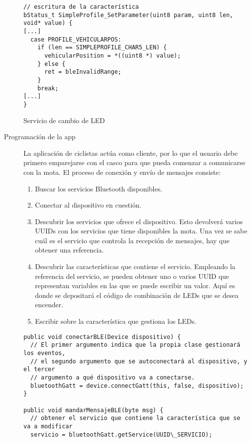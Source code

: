 \begin{description}
\begin{listing}
\begin{minipage}{.4\textwidth}
\begin{verbatim}
// escritura de la característica
bStatus_t SimpleProfile_SetParameter(uint8 param, uint8 len, void* value) {
[...]	
  case PROFILE_VEHICULARPOS:
    if (len == SIMPLEPROFILE_CHAR5_LEN) {
      vehicularPosition = *((uint8 *) value);	
    } else {
      ret = bleInvalidRange;
    }
    break;
[...]
}
			\end{verbatim}
		\end{minipage}
		\caption{Servicio de cambio de LED}\label{alg:mota}
	\end{listing}
	\item[Programación de la app] La aplicación de ciclistas actúa como cliente, por lo que el usuario debe primero emparejarse con el casco para que pueda comenzar a comunicarse con la mota. El proceso de conexión y envío de mensajes consiste:
		\begin{enumerate}
			\item Buscar los servicios Bluetooth disponibles.
			\item Conectar al dispositivo en cuestión.
			\item Descubrir los servicios que ofrece el dispositivo. Esto devolverá varios UUIDs con los servicios que tiene disponibles la mota. Una vez se sabe cuál es el servicio que controla la recepción de mensajes, hay que obtener una referencia. 
			\item Descubrir las características que contiene el servicio. Empleando la referencia del servicio, se pueden obtener uno o varios UUID que representan variables en las que se puede escribir un valor. Aquí es donde se depositará el código de combinación de LEDs que se desea encender.
			\item Escribir sobre la característica que gestiona los LEDs.
		\end{enumerate}
		
		\begin{listing}
			\begin{minipage}{.4\textwidth}
				\begin{verbatim}
public void conectarBLE(Device dispositivo) {
  // El primer argumento indica que la propia clase gestionará los eventos,
  // el segundo argumento que se autoconectará al dispositivo, y el tercer
  // argumento a qué dispositivo va a conectarse.
  bluetoothGatt = device.connectGatt(this, false, dispositivo);	
}

public void mandarMensajeBLE(byte msg) {
  // obtener el servicio que contiene la característica que se va a modificar
  servicio = bluetoothGatt.getService(UUID\_SERVICIO);	
  

\end{verbatim}
\end{minipage}
\end{listing}
\end{description}
